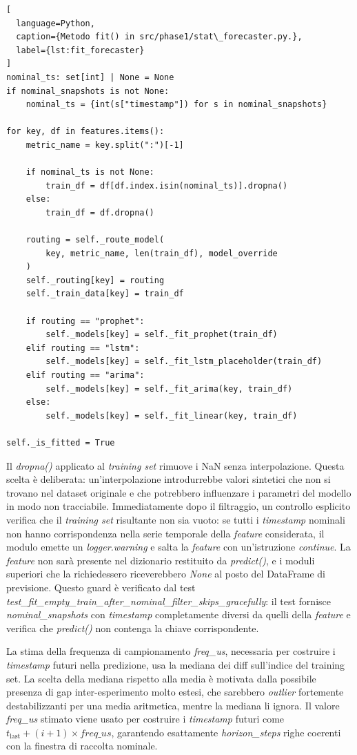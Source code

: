 \begin{lstlisting}[
  language=Python,
  caption={Metodo fit() in src/phase1/stat\_forecaster.py.},
  label={lst:fit_forecaster}
]
nominal_ts: set[int] | None = None
if nominal_snapshots is not None:
    nominal_ts = {int(s["timestamp"]) for s in nominal_snapshots}

for key, df in features.items():
    metric_name = key.split(":")[-1]

    if nominal_ts is not None:
        train_df = df[df.index.isin(nominal_ts)].dropna()
    else:
        train_df = df.dropna()

    routing = self._route_model(
        key, metric_name, len(train_df), model_override
    )
    self._routing[key] = routing
    self._train_data[key] = train_df

    if routing == "prophet":
        self._models[key] = self._fit_prophet(train_df)
    elif routing == "lstm":
        self._models[key] = self._fit_lstm_placeholder(train_df)
    elif routing == "arima":
        self._models[key] = self._fit_arima(key, train_df)
    else:
        self._models[key] = self._fit_linear(key, train_df)

self._is_fitted = True
\end{lstlisting}

Il \textit{dropna()} applicato al \textit{training set} rimuove i NaN senza interpolazione.
Questa scelta è deliberata: un'interpolazione introdurrebbe valori sintetici che non si trovano
nel dataset originale e che potrebbero influenzare i parametri del modello in modo non
tracciabile. Immediatamente dopo il filtraggio, un controllo esplicito verifica che il
\textit{training set} risultante non sia vuoto: se tutti i \textit{timestamp} nominali non hanno
corrispondenza nella serie temporale della \textit{feature} considerata, il modulo emette un
\textit{logger.warning} e salta la \textit{feature} con un'istruzione \textit{continue}. La
\textit{feature} non sarà presente nel dizionario restituito da \textit{predict()}, e i moduli
superiori che la richiedessero riceverebbero \textit{None} al posto del DataFrame di previsione.
Questo guard è verificato dal test
\textit{test\_fit\_empty\_train\_after\_nominal\_filter\_skips\_gracefully}: il test fornisce
\textit{nominal\_snapshots} con \textit{timestamp} completamente diversi da quelli della
\textit{feature} e verifica che \textit{predict()} non contenga la chiave corrispondente.

La stima della frequenza di campionamento \textit{freq\_us}, necessaria per costruire i
\textit{timestamp} futuri nella predizione, usa la mediana dei diff sull'indice del training set.
La scelta della mediana rispetto alla media è motivata dalla possibile presenza di gap
inter-esperimento molto estesi, che sarebbero \textit{outlier} fortemente destabilizzanti per
una media aritmetica, mentre la mediana li ignora. Il valore \textit{freq\_us} stimato viene
usato per costruire i \textit{timestamp} futuri come
$t_{\text{last}} + (i+1) \times \textit{freq\_us}$, garantendo esattamente
\textit{horizon\_steps} righe coerenti con la finestra di raccolta nominale.

